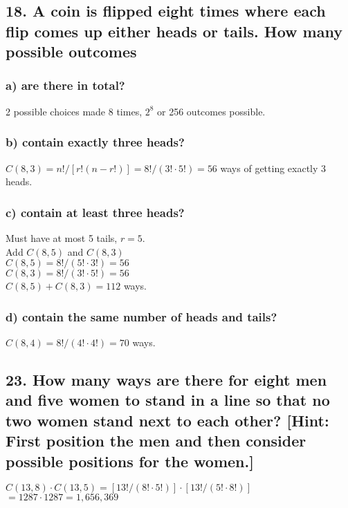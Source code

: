 \documentclass[11pt, oneside]{article} %
\numberwithin{equation}{section} %
\numberwithin{figure}{section} %
\numberwithin{table}{section} %
\begin{document}

\subsection{18. A coin is flipped eight times where each flip comes up either heads or tails. How many possible outcomes}
\subsubsection{a) are there in total?}
2 possible choices made 8 times, $2^8$ or 256 outcomes possible. 
\subsubsection{b) contain exactly three heads?}
$C(8,3) = n!/[r!(n-r!)] = 8!/(3!\cdot 5!) = 56$ ways of getting exactly 3 heads.
\subsubsection{c) contain at least three heads?}
Must have at most 5 tails, $r=5$.\\
Add $C(8,5)$ and $C(8,3)$ \\
$C(8,5) = 8!/(5!\cdot 3!) = 56$ \\
$C(8,3) = 8!/(3!\cdot 5!) = 56$ \\
$C(8,5) + C(8,3) = 112$ ways.
\subsubsection{d) contain the same number of heads and tails?}
$C(8,4) = 8!/(4!\cdot 4!) = 70$ ways.

\subsection{23. How many ways are there for eight men and five women to stand in a line so that no two women stand next to each other? [Hint: First position the men and then consider possible positions for the women.]}
$C(13,8)\cdot C(13,5) = [13!/(8!\cdot 5!)] \cdot [13!/(5!\cdot 8!)]$ \\
$ = 1287 \cdot 1287 = 1,656,369$

\end{document}

